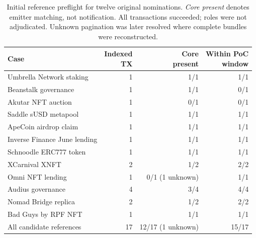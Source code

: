 \begin{table}[H]
\centering\small
\caption{Initial reference preflight for twelve original nominations. \emph{Core present} denotes emitter matching, not notification. All transactions succeeded; roles were not adjudicated. Unknown pagination was later resolved where complete bundles were reconstructed.}
\label{tab:refpreflight}
\begin{tabularx}{\linewidth}{@{}>{\raggedright\arraybackslash}X r r r@{}}
\toprule
Case & \shortstack{Indexed\\TX} & \shortstack{Core\\present} & \shortstack{Within PoC\\window}\\
\midrule
Umbrella Network staking & 1 & 1/1 & 1/1\\
Beanstalk governance & 1 & 1/1 & 0/1\\
Akutar NFT auction & 1 & 0/1 & 0/1\\
Saddle sUSD metapool & 1 & 1/1 & 1/1\\
ApeCoin airdrop claim & 1 & 1/1 & 1/1\\
Inverse Finance June lending & 1 & 1/1 & 1/1\\
Schnoodle ERC777 token & 1 & 1/1 & 1/1\\
XCarnival XNFT & 2 & 1/2 & 2/2\\
Omni NFT lending & 1 & 0/1 (1 unknown) & 1/1\\
Audius governance & 4 & 3/4 & 4/4\\
Nomad Bridge replica & 2 & 1/2 & 2/2\\
Bad Guys by RPF NFT & 1 & 1/1 & 1/1\\
\midrule
All candidate references & 17 & 12/17 (1 unknown) & 15/17\\
\bottomrule
\end{tabularx}
\end{table}
